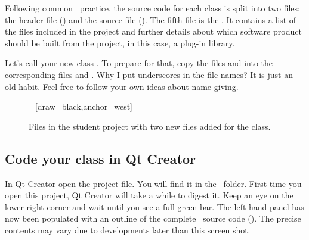 Following common \CPP\ practice, the source code for each class is split into two files: the header file () and the source file (). The fifth file is the . It contains a list of the files included in the project and further details about which software product should be built from the project, in this case, a plug-in library. 

Let's call your new class . To prepare for that, copy the files  and  into the corresponding files  
 and . Why I put underscores in the file names? It is just an old habit. Feel free to follow your own ideas about name-giving.

\begin {figure} [ht]
\centering
{}=[draw=black,anchor=west]
\caption{Files in the student project with two new files added for the  class.}
\label{qt-creator-student-files-2}
\end{figure}

\subsection {Code your class in Qt Creator}
In Qt Creator open the  project file. You will find it in the \devhome\ folder. First time you open this project, Qt Creator will take a while to digest it. Keep an eye on the lower right corner and wait until you see a full green bar.
The left-hand panel has now been populated with an outline of the complete \US\ source code (). The precise contents may vary due to developments later than this screen shot.


